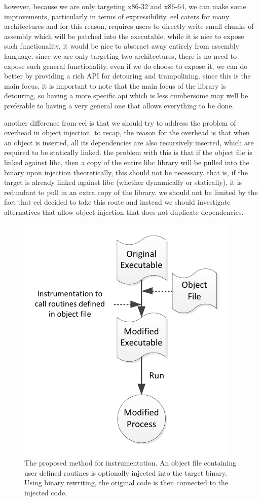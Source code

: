 however, because we are only targeting x86-32 and x86-64, we can make some improvements, particularly in terms of expressibility. eel caters for many architectures and for this reason, requires users to directly write small chunks of assembly which will be patched into the executable. while it is nice to expose such functionality, it would be nice to abstract away entirely from assembly language. since we are only targeting two architectures, there is no need to expose such general functionality. even if we do choose to expose it, we can do better by providing a rich API for detouring and trampolining. since this is the main focus. it is important to note that the main focus of the library is detouring, so having a more specific api which is less cumbersome may well be preferable to having a very general one that allows everything to be done.

another difference from eel is that we should try to address the problem of overhead in object injection. to recap, the reason for the overhead is that when an object is inserted, all its dependencies are also recursively inserted, which are required to be statically linked. the problem with this is that if the object file is linked against libc, then a copy of the entire libc library will be pulled into the binary upon injection 
theoretically, this should not be necessary. that is, if the target is already linked against libc (whether dynamically or statically), it is redundant to pull in an extra copy of the library. we should not be limited by the fact that eel decided to take this route and instead we should investigate alternatives that allow object injection that does not duplicate dependencies.

\begin{figure}[H]
 \centering
 \includegraphics{Workflow.pdf}
 \caption[Hierarchy]{The proposed method for instrumentation. An object file containing user defined routines is optionally injected into the target binary. Using binary rewriting, the original code is then connected to the injected code.}
\label{fig:Workflow}
\end{figure}

